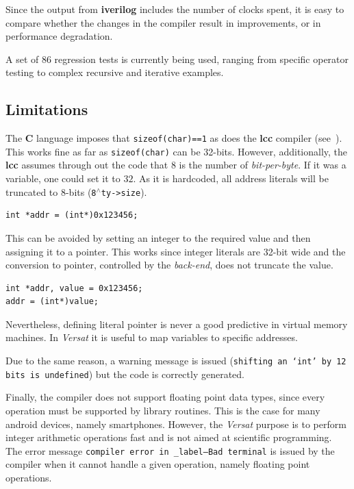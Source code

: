 \documentclass[journal]{IEEEtran}
\begin{document}
Since the output from {\bf iverilog} includes the number
of clocks spent, it is easy to compare whether the changes in the
compiler result in improvements, or in performance degradation.

A set of $86$ regression tests is currently being used, ranging
from specific operator testing to complex recursive and iterative
examples. %

\subsection{Limitations}\label{limitations}

The {\bf C} language imposes that {\tt sizeof(char)==1}
as does the {\bf lcc} compiler (see~\cite[p.79]{hanson95}).
This works fine as far as {\tt sizeof(char)} can be 32-bits.
However, additionally, the {\bf lcc} assumes through out
the code that $8$ is the number of {\em bit-per-byte}.
If it was a variable, one could set it to $32$.
As it is hardcoded, all address literals
will be truncated to 8-bits ({\tt 8}${}^{\wedge}${\tt ty->size}).

{\footnotesize
\begin{verbatim}
int *addr = (int*)0x123456;
\end{verbatim}
}

This can be avoided by setting an integer to the
required value and then assigning it to a pointer.
This works since integer literals are 32-bit wide
and the conversion to pointer, controlled by the
{\it back-end}, does not truncate the value.

{\footnotesize
\begin{verbatim}
int *addr, value = 0x123456;
addr = (int*)value;
\end{verbatim}
}

Nevertheless, defining literal pointer is never
a good predictive in virtual memory machines.
In {\it Versat} it is useful to map variables
to specific addresses.

Due to the same reason, a warning message is issued
({\tt\footnotesize shifting an `int' by 12 bits is
undefined}) but the code is correctly generated.

Finally, the compiler does not support floating point
data types, since every operation must be supported
by library routines.
This is the case for many android devices, namely
smartphones.
However, the {\it Versat} purpose is to perform
integer arithmetic operations fast and is not aimed at
scientific programming.
The error message {\tt\footnotesize compiler error
in \_label--Bad terminal} is issued by the compiler
when it cannot handle a given operation,
namely floating point operations.
\end{document}
